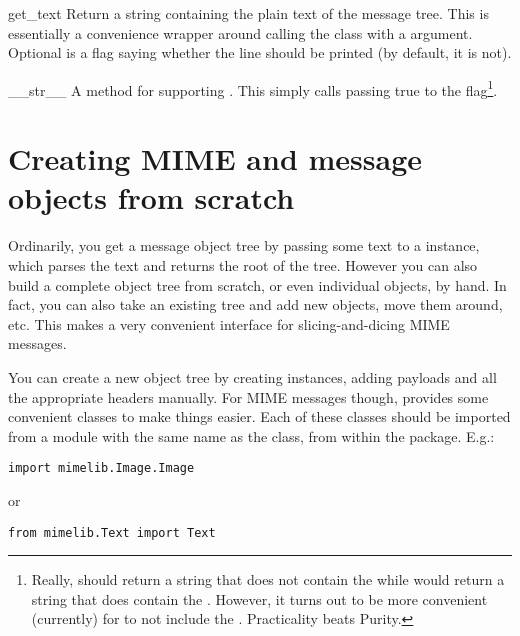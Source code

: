 \documentclass{howto}
\begin{document}
\begin{methoddesc}[StringableMixin]{get_text}{}
Return a string containing the plain text of the message tree.  This
is essentially a convenience wrapper around calling the
 class with a  argument.  Optional
 is a flag saying whether the  line should
be printed (by default, it is not).
\end{methoddesc}

\begin{methoddesc}[ReprMixin]{__str__}{}
A method for supporting .  This simply calls
 passing true to the 
flag\footnote{Really,  should return a string that
does not contain the  while  would
return a string that does contain the .  However, it
turns out to be more convenient (currently) for  to not
include the .  Practicality beats Purity.}.
\end{methoddesc}

\section{Creating MIME and message objects from scratch}

Ordinarily, you get a message object tree by passing some text to a
 instance, which parses the text and returns the root of
the tree.  However you can also build a complete object tree from
scratch, or even individual  objects, by hand.  In fact,
you can also take an existing tree and add new 
objects, move them around, etc.  This makes a very convenient
interface for slicing-and-dicing MIME messages.

You can create a new object tree by creating 
instances, adding payloads and all the appropriate headers manually.
For MIME messages though,  provides some convenient
classes to make things easier.  Each of these classes should be
imported from a module with the same name as the class, from within
the  package.  E.g.:

\begin{verbatim}
import mimelib.Image.Image
\end{verbatim}

or

\begin{verbatim}
from mimelib.Text import Text
\end{verbatim}
\end{document}
